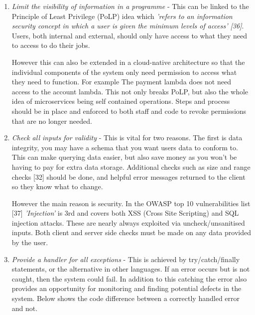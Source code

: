   \begin{enumerate}
    \label{sec:PoLP}
    \item \textit{Limit the visibility of information in a programme} - This can be linked to the Principle of Least Privilege (PoLP) idea which 
    \textit{'refers to an information security concept in which a user is given the minimum levels of access' [36]}. Users, both internal and external, 
    should only have access to what they need to access to do their jobs. 

    However this can also be extended in a cloud-native architecture so that the individual components of the system only need permission to access what 
    they need to function. For example The payment lambda does not need access to the account lambda. This not only breaks PoLP, but also the whole idea of
    microservices being self contained operations. Steps and process should be in place and enforced to both staff and code to revoke permissions that are no
    longer needed.

    \item \textit{Check all inputs for validity} - This is vital for two reasons. The first is data integrity, you may have a schema that you want users
    data to conform to. This can make querying data easier, but also save money as you won't be having to pay for extra data storage. Additional checks such 
    as size and range checks [32] should be done, and helpful error messages returned to the client so they know what to change.
    
    However the main reason is security. In the OWASP top 10 vulnerabilities list [37] \textit{'Injection'} is 3rd and covers both XSS (Cross Site Scripting) 
    and SQL injection attacks. These are nearly always exploited via uncheck/unsanitised inputs. Both client and server side checks must be made on any data
    provided by the user. 

    \item \textit{Provide a handler for all exceptions} - This is achieved by try/catch/finally statements, or the alternative in other languages. If an 
    error occurs but is not caught, then the system could fail. In addition to this catching the error also provides an opportunity for monitoring and 
    finding potential defects in the system. Below shows the code difference between a correctly handled error and not.


\end{enumerate}
